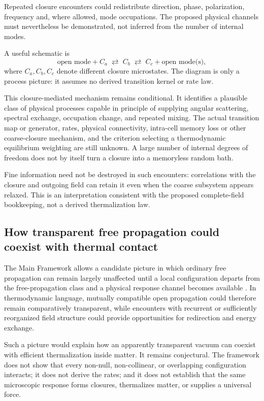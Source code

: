 \documentclass[11pt]{article}
\theoremstyle{definition}
\begin{document}
Repeated closure encounters could redistribute direction, phase, polarization,
frequency and, where allowed, mode occupations.  The proposed physical channels
must nevertheless be demonstrated, not inferred from the number of internal modes.

A useful schematic is
\begin{equation}
  \boxed{
  \text{open mode}+C_a
  \;\rightleftarrows\;
  C_b
  \;\rightleftarrows\;
  C_c+\text{open mode(s)},}
  \label{eq:closure-microcycle}
\end{equation}
where $C_a,C_b,C_c$ denote different closure microstates.  The diagram is only a process
picture: it assumes no derived transition kernel or rate law.

This closure-mediated mechanism remains conditional.  It identifies a plausible class of
physical processes capable in principle of supplying angular scattering, spectral exchange,
occupation change, and repeated mixing.  The actual transition map or generator, rates,
physical connectivity, intra-cell memory loss or other coarse-closure mechanism, and the
criterion selecting a thermodynamic equilibrium weighting are still unknown.  A large number
of internal degrees of freedom does not by itself turn a closure into a memoryless random
bath.

Fine information need not be destroyed in such encounters: correlations with
the closure and outgoing field can retain it even when the coarse subsystem
appears relaxed.  This is an interpretation consistent with the proposed
complete-field bookkeeping, not a derived thermalization law.

\subsection{How transparent free propagation could coexist with thermal contact}

The Main Framework allows a candidate picture in which ordinary free propagation can remain
largely unaffected until a local configuration departs from the free-propagation class and a
physical response channel becomes available \cite{CmotionMainFramework2026}.  In thermodynamic
language, mutually compatible open propagation could therefore remain comparatively
transparent, while encounters with recurrent or sufficiently reorganized field structure
could provide opportunities for redirection and energy exchange.

Such a picture would explain how an apparently transparent vacuum can coexist with efficient
thermalization inside matter.  It remains conjectural.  The framework does not show that
every non-null, non-collinear, or overlapping configuration interacts; it does not derive the
rates; and it does not establish that the same microscopic response forms closures, thermalizes
matter, or supplies a universal force.
\end{document}
